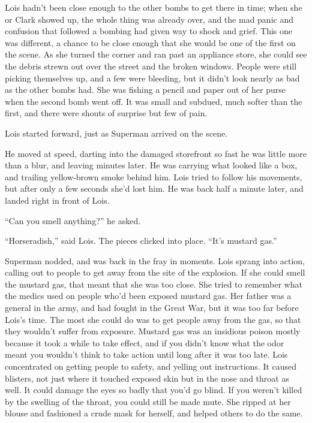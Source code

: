 \documentclass[ebook,12pt]{memoir}
\begin{document}
Lois hadn't been close enough to the other bombs to get there in time;
when she or Clark showed up, the whole thing was already over, and the
mad panic and confusion that followed a bombing had given way to shock
and grief. This one was different, a chance to be close enough that she
would be one of the first on the scene. As she turned the corner and ran
past an appliance store, she could see the debris strewn out over the
street and the broken windows. People were still picking themselves up,
and a few were bleeding, but it didn't look nearly as bad as the other
bombs had. She was fishing a pencil and paper out of her purse when the
second bomb went off. It was small and subdued, much softer than the
first, and there were shouts of surprise but few of pain.

Lois started forward, just as Superman arrived on the scene.

He moved at speed, darting into the damaged storefront so fast he was
little more than a blur, and leaving minutes later. He was carrying what
looked like a box, and trailing yellow‐brown smoke behind him. Lois
tried to follow his movements, but after only a few seconds she'd lost
him. He was back half a minute later, and landed right in front of Lois.

``Can you smell anything?'' he asked.

``Horseradish,'' said Lois. The pieces clicked into place. ``It's
mustard gas.''

Superman nodded, and was back in the fray in moments. Lois sprang into
action, calling out to people to get away from the site of the
explosion. If she could smell the mustard gas, that meant that she was
too close. She tried to remember what the medics used on people who'd
been exposed mustard gas. Her father was a general in the army, and had
fought in the Great War, but it was too far before Lois's time. The most
she could do was to get people away from the gas, so that they wouldn't
suffer from exposure. Mustard gas was an insidious poison mostly because
it took a while to take effect, and if you didn't know what the odor
meant you wouldn't think to take action until long after it was too
late. Lois concentrated on getting people to safety, and yelling out
instructions. It caused blisters, not just where it touched exposed skin
but in the nose and throat as well. It could damage the eyes so badly
that you'd go blind. If you weren't killed by the swelling of the
throat, you could still be made mute. She ripped at her blouse and
fashioned a crude mask for herself, and helped others to do the same.
\end{document}
